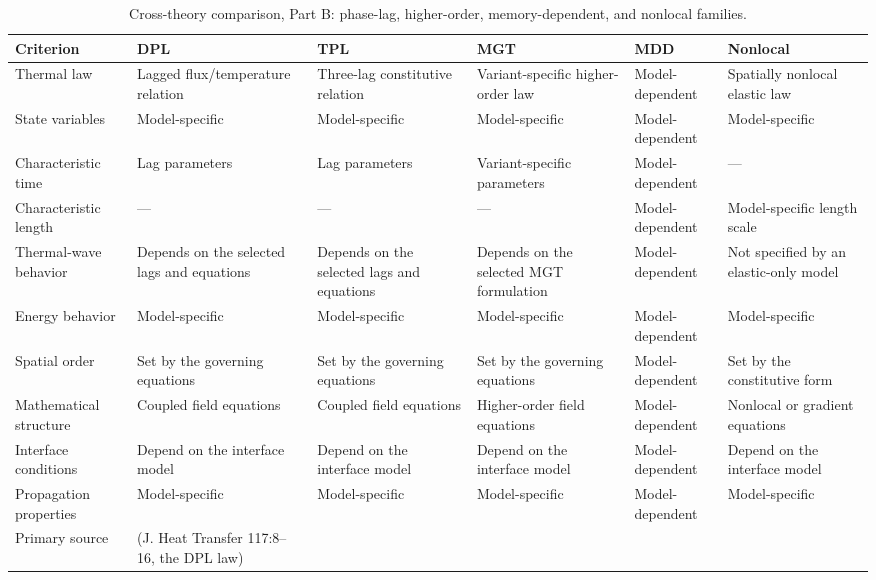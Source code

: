 \begin{table}[htbp]
\centering
\footnotesize
\caption{Cross-theory comparison, Part B: phase-lag, higher-order, memory-dependent, and nonlocal families.}
\label{tab:twelve_criteria_b}
\begin{tabularx}{\textwidth}{@{}>{\raggedright\arraybackslash}p{2.6cm}*{5}{>{\raggedright\arraybackslash}X}@{}}
\toprule
\textbf{Criterion} & \textbf{DPL} & \textbf{TPL} & \textbf{MGT} & \textbf{MDD} & \textbf{Nonlocal} \\
\midrule
Thermal law & Lagged flux/\allowbreak temperature relation & Three-lag constitutive relation & Variant-specific higher-order law & Model-dependent & Spatially nonlocal elastic law \\
State variables & Model-specific & Model-specific & Model-specific & Model-dependent & Model-specific \\
Characteristic time & Lag parameters & Lag parameters & Variant-specific parameters & Model-dependent & --- \\
Characteristic length & --- & --- & --- & Model-dependent & Model-specific length scale \\
Thermal-wave behavior & Depends on the selected lags and equations & Depends on the selected lags and equations & Depends on the selected MGT formulation & Model-dependent & Not specified by an elastic-only model \\
Energy behavior & Model-specific & Model-specific & Model-specific & Model-dependent & Model-specific \\
Spatial order & Set by the governing equations & Set by the governing equations & Set by the governing equations & Model-dependent & Set by the constitutive form \\
Mathematical structure & Coupled field equations & Coupled field equations & Higher-order field equations & Model-dependent & Nonlocal or gradient equations \\
Interface conditions & Depend on the interface model & Depend on the interface model & Depend on the interface model & Model-dependent & Depend on the interface model \\
Propagation properties & Model-specific & Model-specific & Model-specific & Model-dependent & Model-specific \\
Primary source & \cite{Tzou1995} (J. Heat Transfer 117:8--16, the DPL law) & \cite{RoyChoudhuri2007} & \cite{Quintanilla2019} & \cite{Wang2011} & \cite{Eringen1972} \\
\bottomrule
\end{tabularx}
\end{table}

